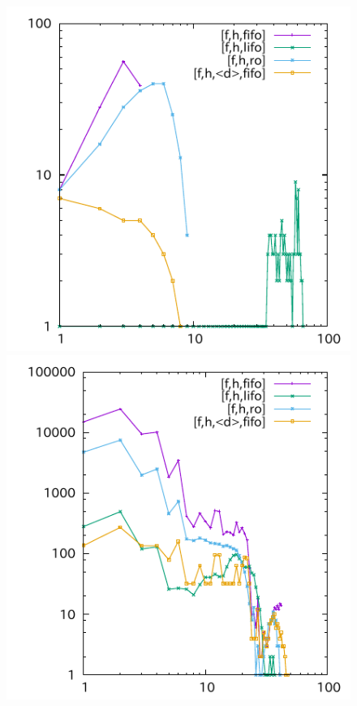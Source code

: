 \begin{figure}[tb]
\includegraphics{img/depth/logistics00-fuel/p016.pdf}
\includegraphics{img/depth/miconic-up/p79.pdf}

\end{figure}
